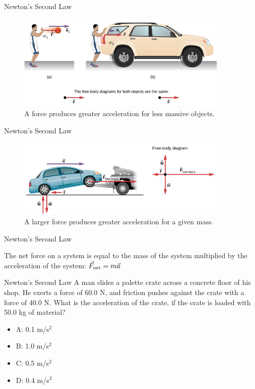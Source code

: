 \documentclass{beamer}
\begin{document}
\begin{frame}{Newton's Second Law}
\begin{figure}
\centering
\includegraphics[width=0.9\textwidth]{figures/NewtonsSecond.png}
\caption{\label{fig:newton1} A force produces greater acceleration for less massive objects.}
\end{figure}
\end{frame}

\begin{frame}{Newton's Second Law}
\begin{figure}
\centering
\includegraphics[width=0.9\textwidth]{figures/NewtonsSecond2.png}
\caption{\label{fig:newton2} A larger force produces greater acceleration for a given mass.}
\end{figure}
\end{frame}

\begin{frame}{Newton's Second Law}
\begin{tcolorbox}[colback=white,colframe=red!40!blue,title=Newton's Second Law]
\alert{The net force on a system is equal to the mass of the system multiplied by the acceleration of the system: $\vec{F}_{\rm net} = m \vec{a}$}
\end{tcolorbox}
\end{frame}

\begin{frame}{Newton's Second Law}
A man slides a palette crate across a concrete floor of his shop.  He exerts a force of 60.0 N, and friction pushes against the crate with a force of 40.0 N.  What is the acceleration of the crate, if the crate is loaded with 50.0 kg of material?
\begin{itemize}
\item A: 0.1 m/s$^2$
\item B: 1.0 m/s$^2$
\item C: 0.5 m/s$^2$
\item D: 0.4 m/s$^2$
\end{itemize}
\end{frame}
\end{document}
